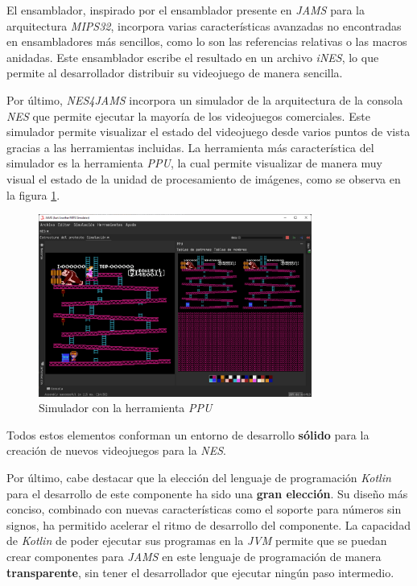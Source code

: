 El ensamblador, inspirado por el ensamblador presente
en \textit{JAMS} para la arquitectura \textit{MIPS32},
incorpora varias características avanzadas no encontradas
en ensambladores más sencillos, como lo son las referencias
relativas o las macros anidadas.
Este ensamblador escribe el resultado en un archivo \textit{iNES},
lo que permite al desarrollador distribuir su videojuego de manera
sencilla.

Por último, \textit{NES4JAMS} incorpora un simulador de la arquitectura
de la consola \textit{NES} que permite ejecutar la mayoría de los
videojuegos comerciales.
Este simulador permite visualizar el estado del videojuego desde varios
puntos de vista gracias a las herramientas incluidas.
La herramienta más característica del simulador es la herramienta
\textit{PPU}, la cual permite visualizar de manera muy visual el estado
de la unidad de procesamiento de imágenes,
como se observa en la figura \ref{fig:nes-result-simulator}.

\begin{figure}[h]
    \centering
    \includegraphics[width=0.8\textwidth]{images/results/nes-simulator}
    \caption{Simulador con la herramienta \textit{PPU}}
    \label{fig:nes-result-simulator}
\end{figure}

Todos estos elementos conforman un entorno de desarrollo
\textbf{sólido} para la creación de nuevos videojuegos
para la \textit{NES}.

Por último, cabe destacar que la elección del lenguaje
de programación \textit{Kotlin} para el desarrollo de
este componente ha sido una \textbf{gran elección}.
Su diseño más conciso, combinado con nuevas características
como el soporte para números sin signos, ha permitido
acelerar el ritmo de desarrollo del componente.
La capacidad de \textit{Kotlin} de poder ejecutar sus
programas en la \textit{JVM} permite que se puedan
crear componentes para \textit{JAMS} en este lenguaje
de programación de manera \textbf{transparente}, sin
tener el desarrollador que ejecutar ningún paso intermedio.
